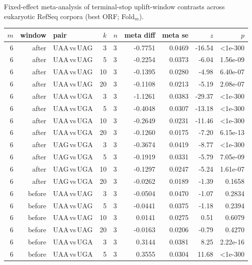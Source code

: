 Fixed-effect meta-analysis of terminal-stop uplift-window contrasts across eukaryotic RefSeq corpora (best ORF; Fold$_m$).

\begingroup
{}
\scriptsize
\setlength{\tabcolsep}{4pt}
\renewcommand{\arraystretch}{1.10}
\setlength{\LTleft}{0pt}
\setlength{\LTright}{0pt}
\begin{longtable}{rrlrlrrrr}
\toprule
$m$ & window & pair & $k$ & $n$ & meta diff & meta se & $z$ & $p$ \\
\midrule
6 & after & UAA$\,$vs$\,$UAG & 3 & 3 & -0.7751 & 0.0469 & -16.54 & <1e-300 \\
6 & after & UAA$\,$vs$\,$UAG & 5 & 3 & -0.2254 & 0.0373 & -6.04 & 1.56e-09 \\
6 & after & UAA$\,$vs$\,$UAG & 10 & 3 & -0.1395 & 0.0280 & -4.98 & 6.40e-07 \\
6 & after & UAA$\,$vs$\,$UAG & 20 & 3 & -0.1108 & 0.0213 & -5.19 & 2.08e-07 \\
6 & after & UAA$\,$vs$\,$UGA & 3 & 3 & -1.1261 & 0.0383 & -29.37 & <1e-300 \\
6 & after & UAA$\,$vs$\,$UGA & 5 & 3 & -0.4048 & 0.0307 & -13.18 & <1e-300 \\
6 & after & UAA$\,$vs$\,$UGA & 10 & 3 & -0.2649 & 0.0231 & -11.46 & <1e-300 \\
6 & after & UAA$\,$vs$\,$UGA & 20 & 3 & -0.1260 & 0.0175 & -7.20 & 6.15e-13 \\
6 & after & UAG$\,$vs$\,$UGA & 3 & 3 & -0.3674 & 0.0419 & -8.77 & <1e-300 \\
6 & after & UAG$\,$vs$\,$UGA & 5 & 3 & -0.1919 & 0.0331 & -5.79 & 7.05e-09 \\
6 & after & UAG$\,$vs$\,$UGA & 10 & 3 & -0.1297 & 0.0247 & -5.24 & 1.61e-07 \\
6 & after & UAG$\,$vs$\,$UGA & 20 & 3 & -0.0262 & 0.0189 & -1.39 & 0.1658 \\
6 & before & UAA$\,$vs$\,$UAG & 3 & 3 & -0.0504 & 0.0470 & -1.07 & 0.2834 \\
6 & before & UAA$\,$vs$\,$UAG & 5 & 3 & -0.0441 & 0.0375 & -1.18 & 0.2394 \\
6 & before & UAA$\,$vs$\,$UAG & 10 & 3 & 0.0141 & 0.0275 & 0.51 & 0.6079 \\
6 & before & UAA$\,$vs$\,$UAG & 20 & 3 & -0.0163 & 0.0206 & -0.79 & 0.4270 \\
6 & before & UAA$\,$vs$\,$UGA & 3 & 3 & 0.3144 & 0.0381 & 8.25 & 2.22e-16 \\
6 & before & UAA$\,$vs$\,$UGA & 5 & 3 & 0.3555 & 0.0304 & 11.68 & <1e-300 \\

\end{longtable}
